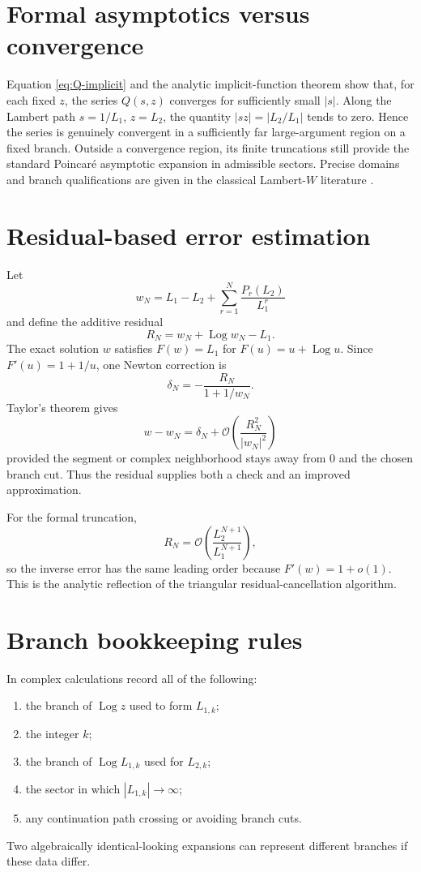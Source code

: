 \documentclass[11pt,oneside]{book}
\theoremstyle{definition}
\theoremstyle{remark}
\DeclareMathOperator{\Log}{Log}
\newcommand{\bigO}{\mathcal O}
\begin{document}
\section{Formal asymptotics versus convergence}
Equation \eqref{eq:Q-implicit} and the analytic implicit-function theorem show
that, for each fixed $z$, the series $Q(s,z)$ converges for sufficiently small
$|s|$.  Along the Lambert path $s=1/L_1$, $z=L_2$, the quantity
$|s z|=|L_2/L_1|$ tends to zero.  Hence the series is genuinely convergent in
a sufficiently far large-argument region on a fixed branch.  Outside a
convergence region, its finite truncations still provide the standard
Poincar\'e asymptotic expansion in admissible sectors.  Precise domains and
branch qualifications are given in the classical Lambert-$W$ literature
\cite{Corless1996,DLMF413}.

\section{Residual-based error estimation}
Let
\begin{equation}\label{eq:W-truncation}
 w_N=L_1-L_2+\sum_{r=1}^{N}\frac{P_r(L_2)}{L_1^r}
\end{equation}
and define the additive residual
\begin{equation}\label{eq:W-residual}
 R_N=w_N+\Log w_N-L_1.
\end{equation}
The exact solution $w$ satisfies $F(w)=L_1$ for $F(u)=u+\Log u$.  Since
$F'(u)=1+1/u$, one Newton correction is
\begin{equation}\label{eq:W-residual-correction}
 \delta_N=-\frac{R_N}{1+1/w_N}.
\end{equation}
Taylor's theorem gives
\begin{equation}\label{eq:W-error-from-residual}
 w-w_N=\delta_N+\bigO\!\left(\frac{R_N^2}{|w_N|^2}\right)
\end{equation}
provided the segment or complex neighborhood stays away from $0$ and the
chosen branch cut.  Thus the residual supplies both a check and an improved
approximation.

For the formal truncation,
\[
 R_N=\bigO\!\left(\frac{L_2^{N+1}}{L_1^{N+1}}\right),
\]
so the inverse error has the same leading order because $F'(w)=1+o(1)$.
This is the analytic reflection of the triangular residual-cancellation
algorithm.

\section{Branch bookkeeping rules}
In complex calculations record all of the following:
\begin{enumerate}
\item the branch of $\Log z$ used to form $L_{1,k}$;
\item the integer $k$;
\item the branch of $\Log L_{1,k}$ used for $L_{2,k}$;
\item the sector in which $|L_{1,k}|\to\infty$;
\item any continuation path crossing or avoiding branch cuts.
\end{enumerate}
Two algebraically identical-looking expansions can represent different
branches if these data differ.
\end{document}
